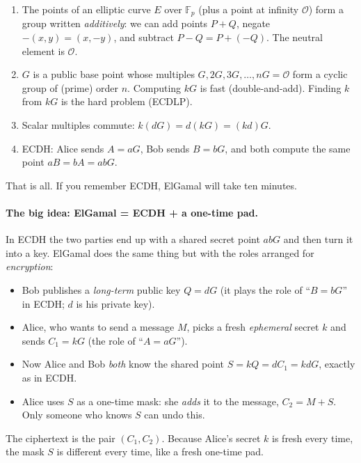 \documentclass[11pt,a4paper,oneside]{book}
\theoremstyle{plain}
\theoremstyle{definition}
\theoremstyle{remark}
\newcommand{\F}{\mathbb{F}}
\newcommand{\Oinf}{\mathcal{O}}
\begin{document}
\begin{keyidea}
\begin{enumerate}[nosep]
\item The points of an elliptic curve $E$ over $\F_p$ (plus a point at infinity $\Oinf$) form a group written \emph{additively}: we can add points $P+Q$, negate $-(x,y)=(x,-y)$, and subtract $P-Q=P+(-Q)$. The neutral element is $\Oinf$.
\item $G$ is a public base point whose multiples $G,2G,3G,\dots,nG=\Oinf$ form a cyclic group of (prime) order $n$. Computing $kG$ is fast (double-and-add). Finding $k$ from $kG$ is the hard problem (ECDLP).
\item Scalar multiples commute: $k(dG)=d(kG)=(kd)G$.
\item ECDH: Alice sends $A=aG$, Bob sends $B=bG$, and both compute the same point $aB=bA=abG$.
\end{enumerate}
That is all. If you remember ECDH, ElGamal will take ten minutes.
\end{keyidea}

\paragraph{The big idea: ElGamal = ECDH + a one-time pad.}
In ECDH the two parties end up with a shared secret point $abG$ and then turn it into a key. ElGamal does the same thing but with the roles arranged for \emph{encryption}:
\begin{itemize}[nosep]
\item Bob publishes a \emph{long-term} public key $Q=dG$ (it plays the role of ``$B=bG$'' in ECDH; $d$ is his private key).
\item Alice, who wants to send a message $M$, picks a fresh \emph{ephemeral} secret $k$ and sends $C_1=kG$ (the role of ``$A=aG$'').
\item Now Alice and Bob \emph{both} know the shared point $S=kQ=dC_1=kdG$, exactly as in ECDH.
\item Alice uses $S$ as a one-time mask: she \emph{adds} it to the message, $C_2=M+S$. Only someone who knows $S$ can undo this.
\end{itemize}
The ciphertext is the pair $(C_1,C_2)$. Because Alice's secret $k$ is fresh every time, the mask $S$ is different every time, like a fresh one-time pad.
\end{document}
